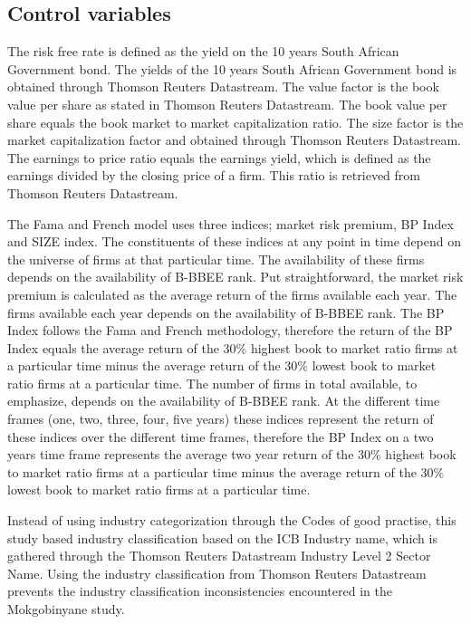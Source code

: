 \subsection{Control variables}
The risk free rate is defined as the yield on the 10 years South African Government bond. The yields of the 10 years South African Government bond is obtained through Thomson Reuters Datastream. The value factor is the book value per share as stated in Thomson Reuters Datastream. The book value per share equals the book market to market capitalization ratio. The size factor is the market capitalization factor and obtained through Thomson Reuters Datastream. The earnings to price ratio equals the earnings yield, which is defined as the earnings divided by the closing price of a firm. This ratio is retrieved from Thomson Reuters Datastream.

The Fama and French model uses three indices; market risk premium, BP Index and SIZE index. The constituents of these indices at any point in time depend on the universe of firms at that particular time. The availability of these firms depends on the availability of B-BBEE rank. Put straightforward, the  market risk premium is calculated as the average return of the firms available each year. The firms available each year depends on the availability of B-BBEE rank.  The BP Index follows the Fama and French methodology, therefore the return of the BP Index equals the average return of the 30\% highest book to market ratio firms at a particular time minus the average return of the 30\% lowest book to market ratio firms at a particular time. The number of firms in total available, to emphasize, depends on the availability of B-BBEE rank. At the different time frames (one, two, three, four, five years) these indices represent the return of these indices over the different time frames, therefore the BP Index on a two years time frame represents the average two year return of the 30\% highest book to market ratio firms at a particular time minus the average return of the 30\% lowest book to market ratio firms at a particular time.

Instead of using industry categorization through the Codes of good practise, this study based industry classification based on the ICB Industry name, which is gathered through the Thomson Reuters Datastream Industry Level 2 Sector Name. Using the industry classification from Thomson Reuters Datastream prevents the industry classification inconsistencies encountered in the Mokgobinyane study.